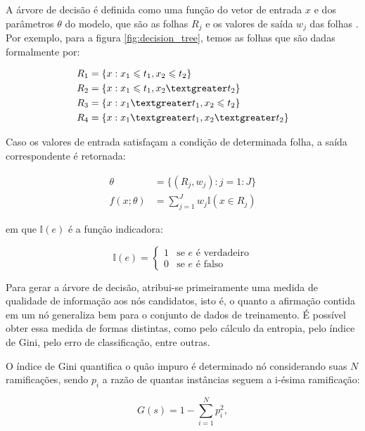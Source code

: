 A árvore de decisão é definida como uma função do vetor de entrada $x$ e dos
parâmetros $\theta$ do modelo, que são as folhas $R_j$ e os valores de saída
$w_j$ das folhas \cite{pml1Book}. Por exemplo, para a figura
\ref{fig:decision_tree}, temos as folhas que são dadas formalmente por:

\begin{align*}
    R_1 &=\{x:x_1 \leqslant  t_1,x_2 \leqslant t_2\}\\
    R_2 &=\{x:x_1 \leqslant  t_1,x_2 \textgreater t_2\}\\
    R_3 &=\{x:x_1 \textgreater  t_1,x_2 \leqslant t_2\}\\
    R_4 &=\{x:x_1 \textgreater  t_1,x_2 \textgreater t_2\}
\end{align*}

Caso os valores de entrada satisfaçam a condição de determinada folha, a saída
correspondente é retornada:

\begin{align}
    \theta &= \{(R_j, w_j) : j = 1 : J \} \\
    f(x;\theta) &= \sum_{j=1}^{J} w_j \mathbb{I} (x \in R_j)
\end{align}

em que $\mathbb{I}(e)$ é a função indicadora:

\begin{equation}
    \mathbb{I}(e) = \begin{cases} 
          1 & \text{se } e \text{ é verdadeiro} \\
          0 & \text{se } e \text{ é falso} 
       \end{cases}
    \end{equation}
    

Para gerar a árvore de decisão, atribui-se primeiramente uma medida de qualidade
de informação aos nós candidatos, isto é, o quanto a afirmação contida em um nó
generaliza bem para o conjunto de dados de treinamento. É possível obter essa
medida de formas distintas, como pelo cálculo da entropia, pelo índice de Gini,
pelo erro de classificação, entre outras.

O índice de Gini quantifica o
quão impuro é determinado nó considerando suas $N$ ramificações, sendo $p_i$
a razão de quantas instâncias seguem a i-ésima ramificação:

\begin{equation}
    G(s) = 1 - \sum_{i=1}^{N} p_{i}^{2},
\end{equation}

